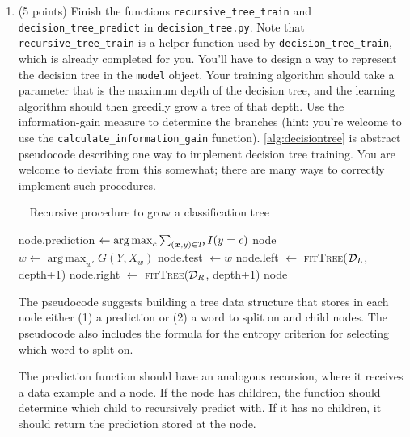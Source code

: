 \documentclass[10pt]{article}
\newcommand{\bx}{{\boldsymbol x}}
\DeclareMathOperator{\argmax}{arg\,max}
\begin{document}
\begin{enumerate}
\item (5 points) Finish the functions \texttt{recursive\_tree\_train} and \texttt{decision\_tree\_predict} in \texttt{decision\_tree.py}. Note that \texttt{recursive\_tree\_train} is a helper function used by \texttt{decision\_tree\_train}, which is already completed for you. You'll have to design a way to represent the decision tree in the \texttt{model} object. Your training algorithm should take a parameter that is the maximum depth of the decision tree, and the learning algorithm should then greedily grow a tree of that depth. Use the information-gain measure to determine the branches (hint: you're welcome to use the \texttt{calculate\_information\_gain} function). \cref{alg:decisiontree} is abstract pseudocode describing one way to implement decision tree training. You are welcome to deviate from this somewhat; there are many ways to correctly implement such procedures.

\begin{algorithm}[tb]
\begin{center}
\caption{~~Recursive procedure to grow a classification tree}
\label{alg:decisiontree}
\begin{algorithmic}[1]
	\State node.prediction $\leftarrow \argmax_c \sum_{(\bx, y) \in {\cal D}} I( y = c )$
	\State \Return node
	\EndIf
\State $w \leftarrow \argmax_{w'} G(Y, X_w)$ 
\State node.test $\leftarrow w$
\State node.left $\leftarrow$ \textsc{fitTree}(${\cal D}_L$, depth+1)
\Comment{where ${\cal D}_L := \{ (\bx,y) \in {\cal D} | x_w = 0 \}$}
\State node.right $\leftarrow$ \textsc{fitTree}(${\cal D}_R$, depth+1)
\Comment{where ${\cal D}_R := \{ (\bx,y) \in {\cal D} | x_w = 1 \}$}
\State \Return node
\EndFunction
\end{algorithmic}
\end{center}
\end{algorithm}

The pseudocode suggests building a tree data structure that stores in each node either (1) a prediction or (2) a word to split on and child nodes. The pseudocode also includes the formula for the entropy criterion for selecting which word to split on. 

The prediction function should have an analogous recursion, where it receives a data example and a node. If the node has children, the function should determine which child to recursively predict with. If it has no children, it should return the prediction stored at the node. 


\end{enumerate}
\end{document}
